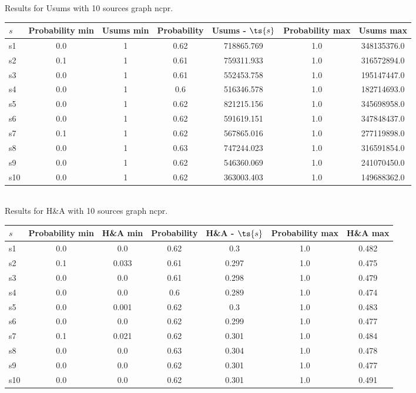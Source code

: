 \documentclass{article}
\begin{document}
\noindent Results for Usums with 10 sources graph ncpr.

\noindent\begin{tabular}{|l|c|c|c|c|c|c|}
\hline
$s$& Probability min & Usums min & Probability & Usums - $\ts{s}$ & Probability max & Usums max\\
\hline
s1 &0.0 & 1 & 0.62 & 718865.769 & 1.0 & 348135376.0\\
\hline
s2 &0.1 & 1 & 0.61 & 759311.933 & 1.0 & 316572894.0\\
\hline
s3 &0.0 & 1 & 0.61 & 552453.758 & 1.0 & 195147447.0\\
\hline
s4 &0.0 & 1 & 0.6 & 516346.578 & 1.0 & 182714693.0\\
\hline
s5 &0.0 & 1 & 0.62 & 821215.156 & 1.0 & 345698958.0\\
\hline
s6 &0.0 & 1 & 0.62 & 591619.151 & 1.0 & 347848437.0\\
\hline
s7 &0.1 & 1 & 0.62 & 567865.016 & 1.0 & 277119898.0\\
\hline
s8 &0.0 & 1 & 0.63 & 747244.023 & 1.0 & 316591854.0\\
\hline
s9 &0.0 & 1 & 0.62 & 546360.069 & 1.0 & 241070450.0\\
\hline
s10 &0.0 & 1 & 0.62 & 363003.403 & 1.0 & 149688362.0\\
\hline
\end{tabular}\\

\noindent Results for H\&A with 10 sources graph ncpr.

\noindent\begin{tabular}{|l|c|c|c|c|c|c|}
\hline
$s$& Probability min & H\&A min & Probability & H\&A - $\ts{s}$ & Probability max & H\&A max\\
\hline
s1 &0.0 & 0.0 & 0.62 & 0.3 & 1.0 & 0.482\\
\hline
s2 &0.1 & 0.033 & 0.61 & 0.297 & 1.0 & 0.475\\
\hline
s3 &0.0 & 0.0 & 0.61 & 0.298 & 1.0 & 0.479\\
\hline
s4 &0.0 & 0.0 & 0.6 & 0.289 & 1.0 & 0.474\\
\hline
s5 &0.0 & 0.001 & 0.62 & 0.3 & 1.0 & 0.483\\
\hline
s6 &0.0 & 0.0 & 0.62 & 0.299 & 1.0 & 0.477\\
\hline
s7 &0.1 & 0.021 & 0.62 & 0.301 & 1.0 & 0.484\\
\hline
s8 &0.0 & 0.0 & 0.63 & 0.304 & 1.0 & 0.478\\
\hline
s9 &0.0 & 0.0 & 0.62 & 0.301 & 1.0 & 0.477\\
\hline
s10 &0.0 & 0.0 & 0.62 & 0.301 & 1.0 & 0.491\\
\hline
\end{tabular}\\
\end{document}

